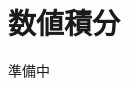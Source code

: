 \documentclass[../../main]{subfiles}
\begin{document}
\chapter{数値積分}
\label{chapter:numerical_differentiation}
\begin{lead}
準備中
\end{lead}
\end{document}
